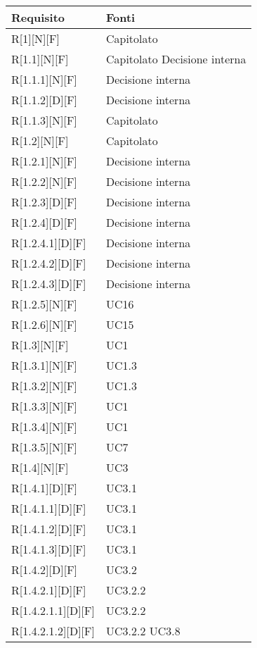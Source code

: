 
\begin{longtable}{X | X}  
			\rowcolor{orange!85}Requisito & Fonti \\
\endhead
R[1][N][F] & Capitolato \\
\hline
R[1.1][N][F] & Capitolato \newline Decisione interna \\
\hline
R[1.1.1][N][F] & Decisione interna \\
\hline
R[1.1.2][D][F] & Decisione interna \\
\hline
R[1.1.3][N][F] & Capitolato \\
\hline
R[1.2][N][F] & Capitolato \\
\hline
R[1.2.1][N][F] & Decisione interna \\
\hline
R[1.2.2][N][F] & Decisione interna \\
\hline
R[1.2.3][D][F] & Decisione interna \\
\hline
R[1.2.4][D][F] & Decisione interna \\
\hline
R[1.2.4.1][D][F] & Decisione interna \\
\hline
R[1.2.4.2][D][F] & Decisione interna \\
\hline
R[1.2.4.3][D][F] & Decisione interna \\
\hline
R[1.2.5][N][F] & UC16 \\
\hline 
R[1.2.6][N][F] & UC15 \\
\hline
R[1.3][N][F] & UC1 \\
\hline
R[1.3.1][N][F] & UC1.3 \\
\hline
R[1.3.2][N][F] & UC1.3 \\
\hline
R[1.3.3][N][F] & UC1 \\
\hline
R[1.3.4][N][F] & UC1 \\
\hline
R[1.3.5][N][F] & UC7 \\
\hline
R[1.4][N][F] & UC3 \\
\hline
R[1.4.1][D][F] & UC3.1 \\
\hline
R[1.4.1.1][D][F] & UC3.1 \\
\hline
R[1.4.1.2][D][F] & UC3.1 \\
\hline
R[1.4.1.3][D][F] & UC3.1 \\
\hline
R[1.4.2][D][F] & UC3.2 \\
\hline
R[1.4.2.1][D][F] & UC3.2.2 \\
\hline
R[1.4.2.1.1][D][F] & UC3.2.2 \\
\hline
R[1.4.2.1.2][D][F] & UC3.2.2 \newline UC3.8 \\
\hline

\end{longtable}
